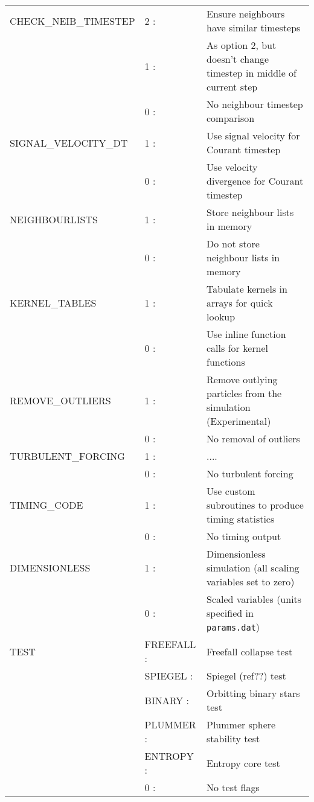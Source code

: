 \documentclass[a4paper]{article}
\newcommand{\var}[1]{\texttt{#1}}
\begin{document}
\begin{center}
\begin{supertabular}{|p{4.6cm}|p{4.6cm} p{6.4cm}|}
 CHECK\_NEIB\_TIMESTEP & 2 :& Ensure neighbours have similar timesteps \\
                       & 1 :& As option 2, but doesn't change timestep in middle of current step \\
                       & 0 :& No neighbour timestep comparison \\ \hline

 SIGNAL\_VELOCITY\_DT  & 1 :& Use signal velocity for Courant timestep \\
                       & 0 :& Use velocity divergence for Courant timestep \\ \hline

 NEIGHBOURLISTS & 1 :& Store neighbour lists in memory \\
                & 0 :& Do not store neighbour lists in memory \\ \hline

 KERNEL\_TABLES & 1 :& Tabulate kernels in arrays for quick lookup \\ 
                & 0 :& Use inline function calls for kernel functions \\ \hline

 REMOVE\_OUTLIERS & 1 :& Remove outlying particles from the simulation (Experimental) \\
                  & 0 :& No removal of outliers \\ \hline

 TURBULENT\_FORCING & 1 :& .... \\
                    & 0 :& No turbulent forcing \\ \hline

 TIMING\_CODE  & 1 :& Use custom subroutines to produce timing statistics \\
               & 0 :& No timing output \\ \hline

 DIMENSIONLESS & 1 :& Dimensionless simulation (all scaling variables 
                      set to zero) \\
               & 0 :& Scaled variables (units specified in \var{params.dat})\\ \hline

 TEST          & FREEFALL :& Freefall collapse test \\
               & SPIEGEL  :& Spiegel (ref??) test \\
               & BINARY   :& Orbitting binary stars test \\
               & PLUMMER  :& Plummer sphere stability test \\
               & ENTROPY  :& Entropy core test \\
               & 0        :& No test flags \\ \hline

\end{supertabular}
\end{center}
\vspace{1cm}
\end{document}
